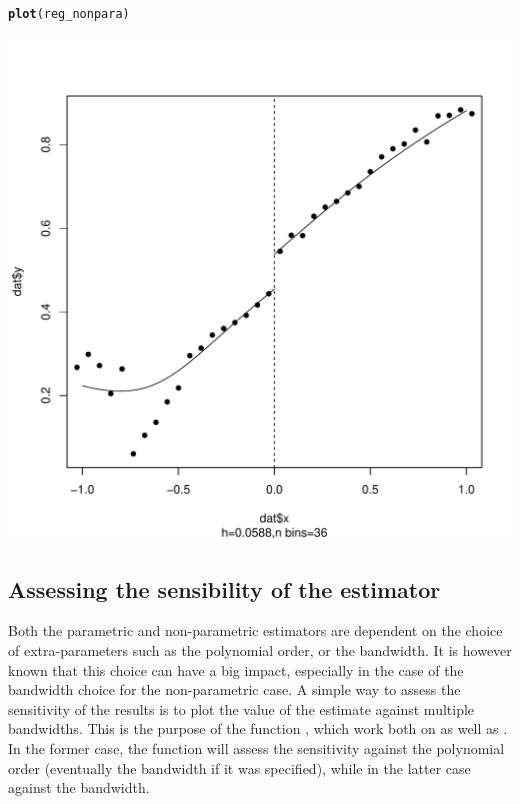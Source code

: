 \documentclass[english,nojss]{jss}\usepackage{graphicx, color}
\makeatletter
\def\maxwidth{ %
  \ifdim\Gin@nat@width>\linewidth
    \linewidth
  \else
    \Gin@nat@width
  \fi
}
\newcommand{\hlfunctioncall}[1]{\textcolor[rgb]{0.501960784313725,0,0.329411764705882}{\textbf{#1}}}%
\newenvironment{kframe}{%
 \def\at@end@of@kframe{}%
 \ifinner\ifhmode%
  \def\at@end@of@kframe{\end{minipage}}%
  \begin{minipage}{\columnwidth}%
 \fi\fi%
 \def\FrameCommand##1{\hskip\@totalleftmargin \hskip-\fboxsep
 \colorbox{shadecolor}{##1}\hskip-\fboxsep
     \hskip-\linewidth \hskip-\@totalleftmargin \hskip\columnwidth}%
 \MakeFramed {\advance\hsize-\width
   \@totalleftmargin\z@ \linewidth\hsize
   \@setminipage}}%
 {\par\unskip\endMakeFramed%
 \at@end@of@kframe}
\newenvironment{knitrout}{}{} %
\makeatother
\begin{document}
\begin{knitrout}
\color{fgcolor}\begin{kframe}
\begin{alltt}
\hlfunctioncall{plot}(reg_nonpara)
\end{alltt}


{\ttfamily\noindent\color{warningcolor}{\#\# Warning: font width unknown for character 0x9}}\end{kframe}
\includegraphics[width=\maxwidth]{figure/unnamed-chunk-12} 

\end{knitrout}



\subsection{Assessing the sensibility of the estimator}

Both the parametric and non-parametric estimators are dependent on
the choice of extra-parameters such as the polynomial order, or the
bandwidth. It is however known that this choice can have a big impact,
especially in the case of the bandwidth choice for the non-parametric
case. A simple way to assess the sensitivity of the results is to
plot the value of the estimate against multiple bandwidths. This is
the purpose of the function , which work both on
 as well as . In the former
case, the function will assess the sensitivity against the polynomial
order (eventually the bandwidth if it was specified), while in the
latter case against the bandwidth. 
\end{document}
